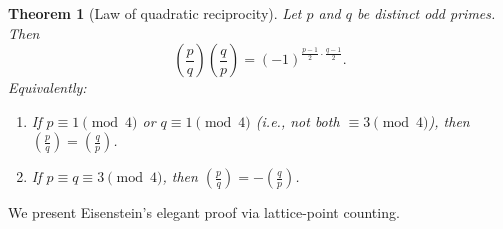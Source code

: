 \documentclass[12pt,a4paper,openany]{book}
\theoremstyle{definition}
\theoremstyle{plain}
\newtheorem{theorem}[definition]{Theorem}
\theoremstyle{remark}
\newcommand{\legendre}[2]{\left(\frac{#1}{#2}\right)}
\begin{document}
\begin{theorem}[Law of quadratic reciprocity]
\label{thm:qr-law}
Let $p$ and $q$ be distinct odd primes. Then
\begin{equation}
\label{eq:qr-law}
  \legendre{p}{q}\legendre{q}{p} = (-1)^{\frac{p-1}{2}\cdot\frac{q-1}{2}}.
\end{equation}
Equivalently:
\begin{enumerate}[label=\textup{(\alph*)}]
  \item If $p \equiv 1 \pmod{4}$ or $q \equiv 1 \pmod{4}$
    \textup{(}i.e., not both $\equiv 3 \pmod 4$\textup{)},
    then $\legendre{p}{q} = \legendre{q}{p}$.
  \item If $p \equiv q \equiv 3 \pmod{4}$, then $\legendre{p}{q} = -\legendre{q}{p}$.
\end{enumerate}
\end{theorem}

We present Eisenstein's elegant proof
via lattice-point counting.
\end{document}
